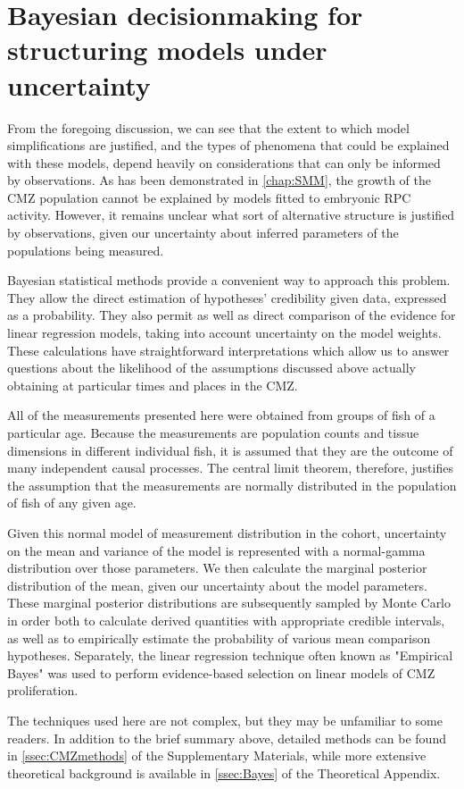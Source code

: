 \section{Bayesian decisionmaking for structuring models under uncertainty}
From the foregoing discussion, we can see that the extent to which model simplifications are justified, and the types of phenomena that could be explained with these models, depend heavily on considerations that can only be informed by observations. As has been demonstrated in \autoref{chap:SMM}, the growth of the CMZ population cannot be explained by models fitted to embryonic RPC activity. However, it remains unclear what sort of alternative structure is justified by observations, given our uncertainty about inferred parameters of the populations being measured.

Bayesian statistical methods provide a convenient way to approach this problem. They allow the direct estimation of hypotheses' credibility given data, expressed as a probability. They also permit as well as direct comparison of the evidence for linear regression models, taking into account uncertainty on the model weights. These calculations have straightforward interpretations which allow us to answer questions about the likelihood of the assumptions discussed above actually obtaining at particular times and places in the CMZ.

All of the measurements presented here were obtained from groups of fish of a particular age. Because the measurements are population counts and tissue dimensions in different individual fish, it is assumed that they are the outcome of many independent causal processes. The central limit theorem, therefore, justifies the assumption that the measurements are normally distributed in the population of fish of any given age.

Given this normal model of measurement distribution in the cohort, uncertainty on the mean and variance of the model is represented with a normal-gamma distribution over those parameters. We then calculate the marginal posterior distribution of the mean, given our uncertainty about the model parameters. These marginal posterior distributions are subsequently sampled by Monte Carlo in order both to calculate derived quantities with appropriate credible intervals, as well as to empirically estimate the probability of various mean comparison hypotheses. Separately, the linear regression technique often known as "Empirical Bayes" was used to perform evidence-based selection on linear models of CMZ proliferation.

The techniques used here are not complex, but they may be unfamiliar to some readers. In addition to the brief summary above, detailed methods can be found in \autoref{ssec:CMZmethods} of the Supplementary Materials, while more extensive theoretical background is available in \autoref{ssec:Bayes} of the Theoretical Appendix. 